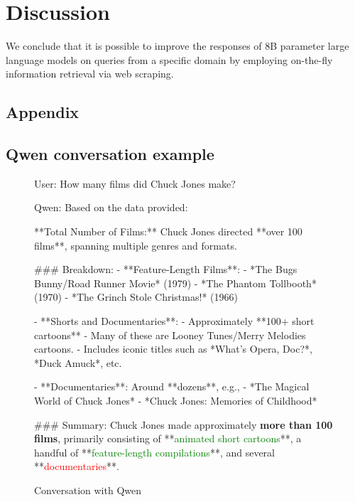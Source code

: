\documentclass[fleqn,moreauthors,10pt]{ds_report}
\newcommand{\red}[1]{\textcolor{red}{#1}}
\newcommand{\green}[1]{\textcolor{green}{#1}}
\begin{document}
\section*{Discussion}

We conclude that it is possible to improve the responses of 8B parameter large language models on queries from a specific domain by employing on-the-fly information retrieval via web scraping.  






\newpage
\begin{appendix}

\section*{Appendix}
\label{append}

\subsection*{Qwen conversation example}

\begin{figure}
\begin{tcolorbox}
User: How many films did Chuck Jones make?

Qwen: Based on the data provided:

	**Total Number of Films:**  
	Chuck Jones directed **over 100 films**, spanning multiple genres and formats.

	\#\#\# Breakdown:
	- **Feature-Length Films**: 
    		- *The Bugs Bunny/Road Runner Movie* (1979)
	    - *The Phantom Tollbooth* (1970)
	    - *The Grinch Stole Christmas!* (1966)

	- **Shorts and Documentaries**:
	    - Approximately **100+ short cartoons**
	        - Many of these are Looney Tunes/Merry Melodies cartoons.
	        - Includes iconic titles such as *What's Opera, Doc?*, *Duck Amuck*, etc.
    
	    - **Documentaries**: Around **dozens**, e.g.,
	    	    - *The Magical World of Chuck Jones*
	        - *Chuck Jones: Memories of Childhood*

	\#\#\# Summary:
	Chuck Jones made approximately \textbf{more than 100 films}, primarily consisting of **\green{animated short cartoons}**, a handful of **\green{feature-length compilations}**, and several **\red{documentaries}**.
\end{tcolorbox}
\caption{Conversation with Qwen}
\label{qwenconvo}
\end{figure}


 


\end{appendix}
\end{document}
